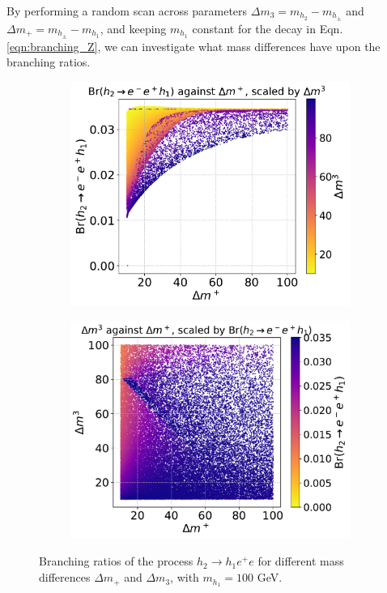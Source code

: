 \documentclass[12pt]{article}
\newcommand{\mhone}{m_{h_1}}
\begin{document}
By performing a random scan across parameters $\Delta m_3 = m_{h_2} - m_{h_\pm}$ and $\Delta m_+ = m_{h_\pm} - m_{h_1}$, and keeping $\mhone$ constant for the decay in Eqn. \ref{eqn:branching_Z}, we can investigate what mass differences have upon the branching ratios. 
\begin{figure}
    \centering
    \begin{subfigure}[b]{0.49\textwidth}
        \centering
        \includegraphics[width=\textwidth]{branching_ratio_plots/Br__h_2__rightarrow_e_-_e___h_1____Delta_m____scale___Delta_m_3_.pdf}
        \caption{}
        \label{fig:Br(h2ee),Dm3_scale}
    \end{subfigure}
    \hfill
    \begin{subfigure}[b]{0.49\textwidth}
        \centering
        \includegraphics[width=\textwidth]{branching_ratio_plots/__Delta_m_3___Delta_m____scale_Br__h_2__rightarrow_e_-_e___h_1__.pdf}
        \caption{}
        \label{fig:Br(h2ee),Br_scale}
    \end{subfigure}
    \caption{Branching ratios of the process $h_2 \rightarrow h_1 e^+e$ for different mass differences $\Delta m_+$ and $\Delta m_3$, with $m_{h_1} =100$ GeV.}
    \label{fig:Br(h2ee)}
\end{figure}
\end{document}
